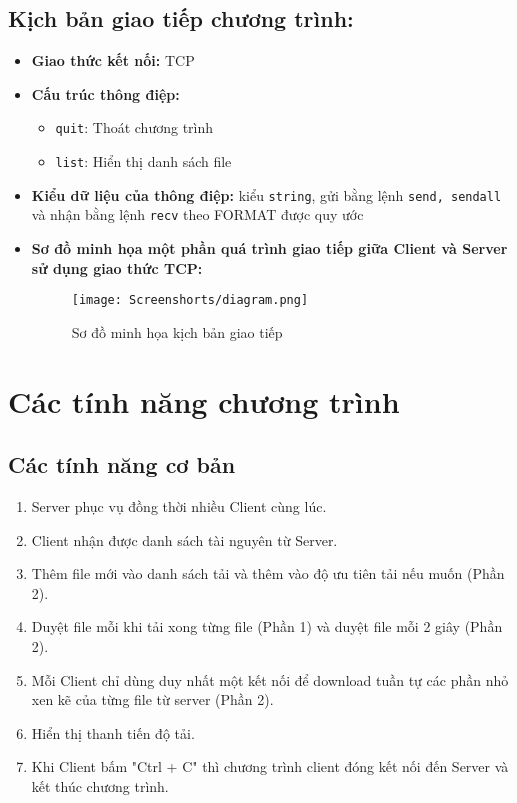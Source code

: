 \documentclass[a4paper,12pt]{report}
\begin{document}
\subsection{Kịch bản giao tiếp chương trình:}
\begin{itemize}
  \item \textbf{Giao thức kết nối:} TCP
  \item \textbf{Cấu trúc thông điệp:}
        \begin{itemize}
          \item \verb|quit|: Thoát chương trình
          \item \verb|list|: Hiển thị danh sách file
        \end{itemize}
  \item \textbf{Kiểu dữ liệu của thông điệp:} kiểu \verb|string|, gửi bằng lệnh \verb|send, sendall| và nhận bằng lệnh \verb|recv| theo FORMAT được quy ước
  \item \textbf{Sơ đồ minh họa một phần quá trình giao tiếp giữa Client và Server sử dụng giao thức TCP:}
        \begin{figure}[ht]
          \centering
          \texttt{[image: Screenshorts/diagram.png]}
          \caption{Sơ đồ minh họa kịch bản giao tiếp}\label{fig:diagram}
        \end{figure}
\end{itemize}

\pagebreak
\section{Các tính năng chương trình}
    \subsection{Các tính năng cơ bản}
      \begin{enumerate}
        \item Server phục vụ đồng thời nhiều Client cùng lúc.
        \item Client nhận được danh sách tài nguyên từ Server. 
        \item Thêm file mới vào danh sách  tải và thêm vào độ ưu tiên tải nếu muốn (Phần 2).
        \item Duyệt file mỗi khi tải xong từng file (Phần 1) và duyệt file mỗi 2 giây (Phần 2).
        \item Mỗi Client chỉ dùng duy nhất một kết nối để download tuần tự các phần nhỏ xen kẽ của từng file từ server (Phần 2).
        \item Hiển thị thanh tiến độ tải.
        \item Khi Client bấm "Ctrl + C" thì chương trình client đóng kết nối đến Server và kết thúc chương trình.
    \end{enumerate}
\end{document}
